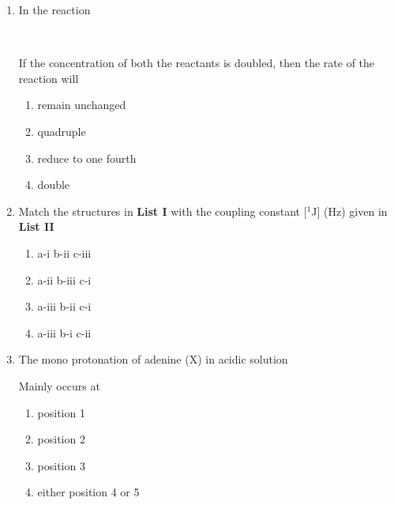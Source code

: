 \documentclass[journal,12pt,onecolumn]{IEEEtran}
\theoremstyle{remark}
\begin{document}
\begin{enumerate}
 

\item  In the reaction \hfill{}

\


If the concentration of both the reactants is doubled, then the rate of the reaction will

\begin{multicols}{2}
\begin{enumerate}
     \item   remain unchanged
     \item   quadruple
     \item   reduce to one fourth
     \item   double
\end{enumerate}
\end{multicols}

 

\item  Match the structures in \textbf{List I} with the coupling constant [$^1$J] (Hz) given in \textbf{List II} \hfill{}



\begin{multicols}{2}
\begin{enumerate}
     \item   a-i \quad b-ii \quad c-iii
     \item   a-ii \quad b-iii \quad c-i
     \item   a-iii \quad b-ii \quad c-i
     \item   a-iii \quad b-i \quad c-ii
\end{enumerate}
\end{multicols}




 

\item  The mono protonation of adenine (X) in acidic solution \hfill{}





Mainly occurs at \hfill{  }

\begin{multicols}{2}
\begin{enumerate}
     \item   position 1
     \item   position 2
     \item   position 3
     \item   either position 4 or 5
\end{enumerate}
\end{multicols}


\end{enumerate}
\end{document}
